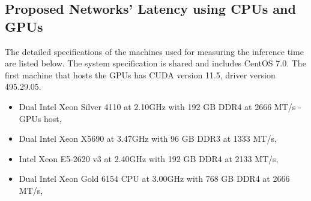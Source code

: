 \indo{|}
\indo{|}
\indo{|}
\indo{|}
\indo{|}


\subsection{Proposed Networks' Latency using CPUs and GPUs}

\indo{|}
\indo{|}

The detailed specifications of the machines used for measuring the inference time are listed below. The system specification is shared and includes CentOS 7.0. The first machine that hosts the GPUs has CUDA version 11.5, driver version 495.29.05.

\begin{itemize}
  \item Dual Intel Xeon Silver 4110 at 2.10GHz with 192 GB DDR4 at 2666 MT/s - GPUs host,
  \item Dual Intel Xeon X5690 at 3.47GHz with 96 GB DDR3 at 1333 MT/s,
  \item Intel Xeon E5-2620 v3 at 2.40GHz with 192 GB DDR4 at 2133 MT/s,
  \item Dual Intel Xeon Gold 6154 CPU at 3.00GHz with 768 GB DDR4 at 2666 MT/s,
\end{itemize}



